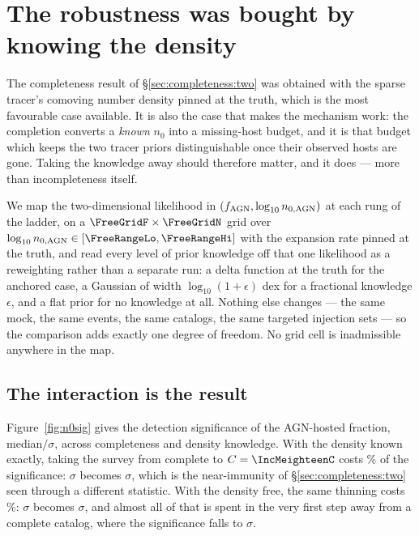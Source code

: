 \section{The robustness was bought by knowing the density}
\label{sec:density}

The completeness result of \S\ref{sec:completeness:two} was obtained with the
sparse tracer's comoving number density pinned at the truth, which is the most
favourable case available. It is also the case that makes the mechanism work:
the completion converts a \emph{known} $n_0$ into a missing-host budget, and it
is that budget which keeps the two tracer priors distinguishable once their
observed hosts are gone. Taking the knowledge away should therefore matter, and
it does --- more than incompleteness itself.

We map the two-dimensional likelihood in $(f_{\rm AGN}, \log_{10} n_{0,\rm AGN})$ at each rung of
the ladder, on a $\FreeGridF \times \FreeGridN$ grid over
$\lognzagn \in [\FreeRangeLo, \FreeRangeHi]$ with the expansion rate pinned at
the truth, and read every level of prior knowledge off that one likelihood as a
reweighting rather than a separate run: a delta function at the truth for the
anchored case, a Gaussian of width $\log_{10}(1+\epsilon)$ dex for a fractional
knowledge $\epsilon$, and a flat prior for no knowledge at all. Nothing else
changes --- the same mock, the same events, the same catalogs, the same targeted
injection sets --- so the comparison adds exactly one degree of freedom. No grid
cell is inadmissible anywhere in the map.

\subsection{The interaction is the result}
\label{sec:density:interaction}

Figure~\ref{fig:n0sig} gives the detection significance of the AGN-hosted
fraction, median$/\sigma$, across completeness and density knowledge. With the density known exactly, taking the survey from complete to
$C = \IncMeighteenC$ costs \FreeCostExact\% of the significance:
\FreeCompleteExactSig$\sigma$ becomes \FreeMeighteenExactSig$\sigma$, which is
the near-immunity of \S\ref{sec:completeness:two} seen through a different
statistic. With the density free, the same thinning costs \FreeCostFree\%:
\FreeCompleteFreeSig$\sigma$ becomes \FreeMeighteenFreeSig$\sigma$, and almost
all of that is spent in the very first step away from a complete catalog, where
the significance falls to \FreeMtwentyoneFreeSig$\sigma$.


